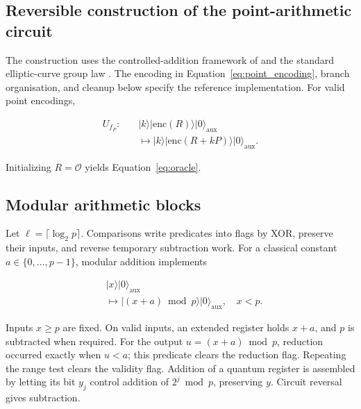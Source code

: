 \appendix
\begin{revision}
\section{Reversible construction of the point-arithmetic circuit}    
\label{app:oracle}

The construction uses the controlled-addition framework of \cite{ProosZalka2003,Roetteler2017} and the standard elliptic-curve group law \cite{Silverman2009,Washington2008}. The encoding in Equation~\eqref{eq:point_encoding}, branch organisation, and cleanup below specify the reference implementation. For valid point encodings,

\begin{equation}
    \label{eq:reversible_circuit}
    \begin{aligned}
        U_{f_P}:\quad
        &\lvert k\rangle\lvert\mathrm{enc}(R)\rangle
         \lvert0\rangle_{\mathrm{aux}}\\
        &\longmapsto
         \lvert k\rangle\lvert\mathrm{enc}(R+kP)\rangle
         \lvert0\rangle_{\mathrm{aux}}.
    \end{aligned}
\end{equation}

Initializing $R=\mathcal O$ yields Equation~\eqref{eq:oracle}.

\subsection{Modular arithmetic blocks}

Let $\ell=\lceil\log_2p\rceil$. Comparisons write predicates into flags by XOR, preserve their inputs, and reverse temporary subtraction work. For a classical constant $a\in\{0,\ldots,p-1\}$, modular addition implements

\begin{equation}
    \label{eq:app_r5_constant_addition}
    \begin{aligned}
        &\lvert x\rangle\lvert0\rangle_{\mathrm{aux}}\\
        &\longmapsto\lvert(x+a)\bmod p\rangle
         \lvert0\rangle_{\mathrm{aux}},\quad x<p.
    \end{aligned}
\end{equation}

Inputs $x\geq p$ are fixed. On valid inputs, an extended register holds $x+a$, and $p$ is subtracted when required. For the output $u=(x+a)\bmod p$, reduction occurred exactly when $u<a$; this predicate clears the reduction flag. Repeating the range test clears the validity flag. Addition of a quantum register is assembled by letting its bit $y_j$ control addition of $2^j\bmod p$, preserving $y$. Circuit reversal gives subtraction.


\end{revision}
